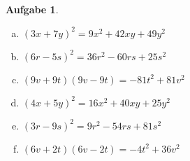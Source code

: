 \documentclass[12pt,fleqn]{article}
\theoremstyle{aufg}
\newtheorem{aufgabe}{Aufgabe}
\theoremstyle{bsp}
\begin{document}
\begin{flushleft}
\begin{aufgabe}
\begin{multicols}{3}
\begin{enumerate}[a)]
\item 
$(3x+7y)^2=9 x^{2} + 42 x y + 49 y^{2}$
\item 
$(6r-5s)^2=36 r^{2} - 60 r s + 25 s^{2}$
\item 
$(9v+9t)(9v-9t)=- 81 t^{2} + 81 v^{2}$
\item 
$(4x+5y)^2=16 x^{2} + 40 x y + 25 y^{2}$
\item 
$(3r-9s)^2=9 r^{2} - 54 r s + 81 s^{2}$
\item 
$(6v+2t)(6v-2t)=- 4 t^{2} + 36 v^{2}$
\end{enumerate} 
\end{multicols} 
\end{aufgabe} 
\end{flushleft} 
\end{document}
